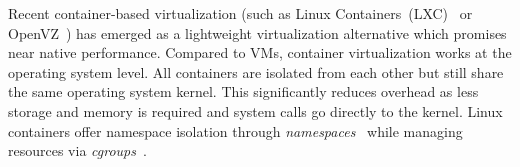 %
%
%
%
%
%
%
%
%


Recent container-based virtualization (such as Linux Containers~(LXC)~\cite{linux-lxc} or
OpenVZ~\cite{bibid}) has emerged as a lightweight virtualization alternative
which promises near native performance.
%
Compared to VMs, container virtualization works at the
operating system level. %
%
All containers are isolated from each other but still share the same operating
system kernel. This significantly reduces overhead as less storage and memory is
required and system calls go directly to the kernel. 
%
Linux containers offer namespace isolation through
\textit{namespaces}~\cite{linux-namespaces}
while managing resources via \textit{cgroups}~\cite{linux-cgroups}.


%
%


